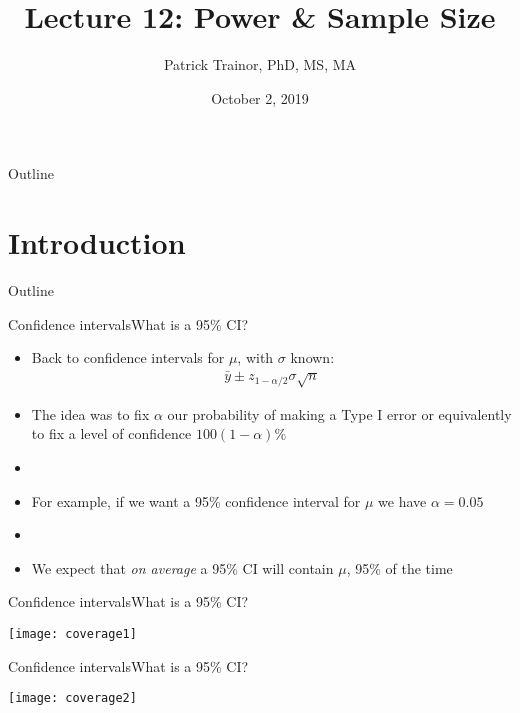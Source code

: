 \documentclass[xcolor=dvipsnames]{beamer}
\title[Lecture 12]{Lecture 12: Power \& Sample Size}
\author[Patrick Trainor]{Patrick Trainor, PhD, MS, MA}
\institute[NMSU]{New Mexico State University}
\date{October 2, 2019}
\begin{document}
\begin{frame}
\maketitle
\end{frame}

\begin{frame}{Outline}
\tableofcontents[hideallsubsections]
\end{frame}

\section{Introduction}
\begin{frame}{Outline}
\tableofcontents[currentsection,subsectionstyle=show/shaded/hide]
\end{frame}

\begin{frame}{Confidence intervals}{What is a 95\% CI?}
\begin{itemize}
	\item Back to confidence intervals for $\mu$, with $\sigma$ known:
	\begin{gather*}
		\bar{y}\pm z_{1-\alpha/2} \sigma \sqrt{n}
	\end{gather*}
	\item The idea was to fix $\alpha$ our probability of making a Type I error or equivalently to fix a level of confidence $100(1-\alpha)\%$
	\item[]
	\item For example, if we want a 95\% confidence interval for $\mu$ we have $\alpha = 0.05$
	\item[]
	\item We expect that \emph{on average} a 95\% CI will contain $\mu$,  95\% of the time
\end{itemize}
\end{frame}

\begin{frame}{Confidence intervals}{What is a 95\% CI?}
	\begin{center}
		\texttt{[image: coverage1]}
	\end{center}
\end{frame}

\begin{frame}{Confidence intervals}{What is a 95\% CI?}
\begin{center}
	\texttt{[image: coverage2]}
\end{center}
\end{frame}
\end{document}
